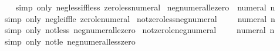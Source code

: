 \begin{isabellebody}
%
\isadelimproof
\ \ %
\endisadelimproof
%
\isatagproof
{}\isamarkupfalse%
\ {\isacharparenleft}{\kern0pt}simp\ only{\isacharcolon}{\kern0pt}\ neg{\isacharunderscore}{\kern0pt}less{\isacharunderscore}{\kern0pt}{}{\isacharunderscore}{\kern0pt}iff{\isacharunderscore}{\kern0pt}less\ zero{\isacharunderscore}{\kern0pt}less{\isacharunderscore}{\kern0pt}numeral{\isacharparenright}{\kern0pt}%
\endisatagproof
{\isafoldproof}%
%
\isadelimproof
\isanewline
%
\endisadelimproof
\isanewline
{}\isamarkupfalse%
\ neg{\isacharunderscore}{\kern0pt}numeral{\isacharunderscore}{\kern0pt}le{\isacharunderscore}{\kern0pt}zero{\isacharcolon}{\kern0pt}\ {\isachardoublequoteopen}{\isacharminus}{\kern0pt}\ numeral\ n\ {\isasymle}\ {}{\isachardoublequoteclose}\isanewline
%
\isadelimproof
\ \ %
\endisadelimproof
%
\isatagproof
{}\isamarkupfalse%
\ {\isacharparenleft}{\kern0pt}simp\ only{\isacharcolon}{\kern0pt}\ neg{\isacharunderscore}{\kern0pt}le{\isacharunderscore}{\kern0pt}{}{\isacharunderscore}{\kern0pt}iff{\isacharunderscore}{\kern0pt}le\ zero{\isacharunderscore}{\kern0pt}le{\isacharunderscore}{\kern0pt}numeral{\isacharparenright}{\kern0pt}%
\endisatagproof
{\isafoldproof}%
%
\isadelimproof
\isanewline
%
\endisadelimproof
\isanewline
{}\isamarkupfalse%
\ not{\isacharunderscore}{\kern0pt}zero{\isacharunderscore}{\kern0pt}less{\isacharunderscore}{\kern0pt}neg{\isacharunderscore}{\kern0pt}numeral{\isacharcolon}{\kern0pt}\ {\isachardoublequoteopen}{\isasymnot}\ {}\ {\isacharless}{\kern0pt}\ {\isacharminus}{\kern0pt}\ numeral\ n{\isachardoublequoteclose}\isanewline
%
\isadelimproof
\ \ %
\endisadelimproof
%
\isatagproof
{}\isamarkupfalse%
\ {\isacharparenleft}{\kern0pt}simp\ only{\isacharcolon}{\kern0pt}\ not{\isacharunderscore}{\kern0pt}less\ neg{\isacharunderscore}{\kern0pt}numeral{\isacharunderscore}{\kern0pt}le{\isacharunderscore}{\kern0pt}zero{\isacharparenright}{\kern0pt}%
\endisatagproof
{\isafoldproof}%
%
\isadelimproof
\isanewline
%
\endisadelimproof
\isanewline
{}\isamarkupfalse%
\ not{\isacharunderscore}{\kern0pt}zero{\isacharunderscore}{\kern0pt}le{\isacharunderscore}{\kern0pt}neg{\isacharunderscore}{\kern0pt}numeral{\isacharcolon}{\kern0pt}\ {\isachardoublequoteopen}{\isasymnot}\ {}\ {\isasymle}\ {\isacharminus}{\kern0pt}\ numeral\ n{\isachardoublequoteclose}\isanewline
%
\isadelimproof
\ \ %
\endisadelimproof
%
\isatagproof
{}\isamarkupfalse%
\ {\isacharparenleft}{\kern0pt}simp\ only{\isacharcolon}{\kern0pt}\ not{\isacharunderscore}{\kern0pt}le\ neg{\isacharunderscore}{\kern0pt}numeral{\isacharunderscore}{\kern0pt}less{\isacharunderscore}{\kern0pt}zero{\isacharparenright}{\kern0pt}%

\end{isabellebody}
